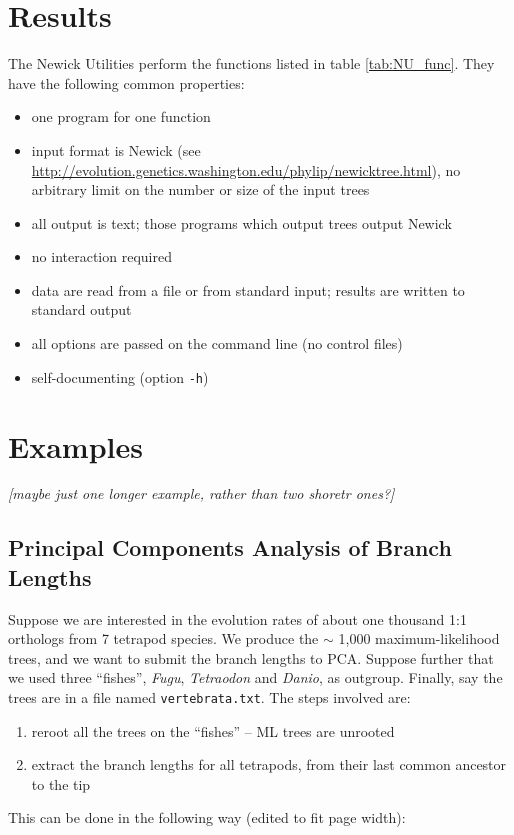 \documentclass{bioinfo}
\newcommand{\nutils}{Newick Utilities}
\begin{document}
\section{Results}

The \nutils{} perform the functions listed in table \ref{tab:NU_func}. They have the following common properties:

\begin{itemize}
 \item one program for one function
 \item input format is Newick (see \url{http://evolution.genetics.washington.edu/phylip/newicktree.html}), no arbitrary limit on the number or size of the input trees
 \item all output is text; those programs which output trees output Newick
 \item no interaction required
 \item data are read from a file or from standard input; results are written to standard output
 \item all options are passed on the command line (no control files)
 \item self-documenting (option \texttt{-h})
\end{itemize}

\section*{Examples}

\emph{[maybe just one longer example, rather than two shoretr ones?]}

\subsection*{Principal Components Analysis of Branch Lengths}

Suppose we are interested in the evolution rates of about one thousand 1:1 orthologs from 7 tetrapod species. We produce the $\sim$ 1,000 maximum-likelihood trees, and we want to submit the branch lengths to \textsc{PCA}. Suppose further that we used three ``fishes'', \textit{Fugu}, \textit{Tetraodon} and \textit{Danio}, as outgroup. Finally, say the trees are in a file named \texttt{vertebrata.txt}. The steps involved are:
\begin{enumerate}
 \item reroot all the trees on the ``fishes'' -- ML trees are unrooted
 \item extract the branch lengths for all tetrapods, from their last common ancestor to the tip
\end{enumerate}
This can be done in the following way (edited to fit page width):
\end{document}
